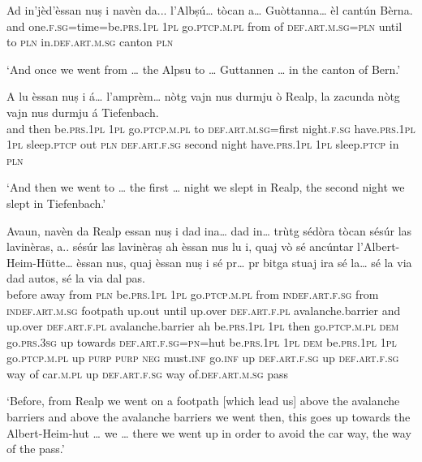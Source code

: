 \begin{linenumbers}
\gll  Ad in’jèd’èssan nuṣ i navèn da... l’Albṣú… tòcan a… Guòttanna… èl cantún Bèrna.  \\
and one.\textsc{f.sg=}time=be.\textsc{prs.1pl} \textsc{1pl} go.\textsc{ptcp.m.pl} from of  \textsc{def.art.m.sg=pln} until to \textsc{pln} in.\textsc{def.art.m.sg} canton \textsc{pln}  \\
\end{linenumbers}
\medskip
\glt `And once we went from … the Alpsu to … Guttannen … in the canton of Bern.'
\medskip

\begin{linenumbers}
\gll  A lu èssan nuṣ i á… l’amprèm… nòtg vajn nus durmju ò Realp, la zacunda nòtg vajn nus durmju á Tiefenbach.  \\
and then be.\textsc{prs.1pl} \textsc{1pl} go.\textsc{ptcp.m.pl} to \textsc{def.art.m.sg}=first  night.\textsc{f.sg} have.\textsc{prs.1pl} \textsc{1pl} sleep.\textsc{ptcp} out  \textsc{pln} \textsc{def.art.f.sg} second night have.\textsc{prs.1pl} \textsc{1pl}  sleep.\textsc{ptcp} in  \textsc{pln}\\
\end{linenumbers}
\medskip
\glt `And then we went to … the first … night we slept in Realp, the second night we slept in Tiefenbach.'
\medskip


\begin{linenumbers}
\gll  Avaun, navèn da Realp essan nuṣ i dad ina… dad in… trùtg sédòra tòcan sésúr las lavinèras, a.. sésúr las lavinèraṣ ah èssan nus lu i, quaj vò sé ancúntar l’Albert-Heim-Hütte… èssan nus, quaj èssan nuṣ i sé pr… pr bitga stuaj ira sé la… sé la via dad autos, sé la via dal pas.   \\
before away from \textsc{pln} be.\textsc{prs.1pl} \textsc{1pl} go.\textsc{ptcp.m.pl}  from \textsc{indef.art.f.sg} from \textsc{indef.art.m.sg} footpath up.out until up.over \textsc{def.art.f.pl} avalanche.barrier and up.over  \textsc{def.art.f.pl} avalanche.barrier ah be.\textsc{prs.1pl} \textsc{1pl} then go.\textsc{ptcp.m.pl} \textsc{dem} go.\textsc{prs.3sg} up towards \textsc{def.art.f.sg}=\textsc{pn=}hut be.\textsc{prs.1pl} \textsc{1pl} \textsc{dem} be.\textsc{prs.1pl} \textsc{1pl}  go.\textsc{ptcp.m.pl} up  \textsc{purp} \textsc{purp} \textsc{neg} must.\textsc{inf} go.\textsc{inf} up \textsc{def.art.f.sg} up \textsc{def.art.f.sg} way of car.\textsc{m.pl} up \textsc{def.art.f.sg} way  of.\textsc{def.art.m.sg} pass  \\
\end{linenumbers}
\medskip
\glt `Before, from Realp we went on a footpath [which lead us] above the avalanche barriers and above the avalanche barriers we went then, this goes up towards the Albert-Heim-hut … we … there we went up in order to avoid the car way, the way of the pass.'
\medskip

